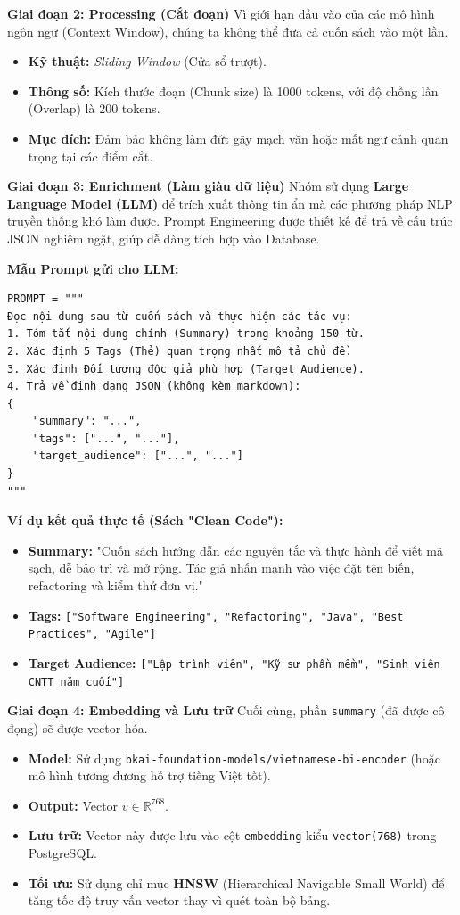 \textbf{Giai đoạn 2: Processing (Cắt đoạn)}
Vì giới hạn đầu vào của các mô hình ngôn ngữ (Context Window), chúng ta không thể đưa cả cuốn sách vào một lần.
\begin{itemize}
    \item \textbf{Kỹ thuật:} \textit{Sliding Window} (Cửa sổ trượt).
    \item \textbf{Thông số:} Kích thước đoạn (Chunk size) là 1000 tokens, với độ chồng lấn (Overlap) là 200 tokens.
    \item \textbf{Mục đích:} Đảm bảo không làm đứt gãy mạch văn hoặc mất ngữ cảnh quan trọng tại các điểm cắt.
\end{itemize}

\textbf{Giai đoạn 3: Enrichment (Làm giàu dữ liệu)}
Nhóm sử dụng \textbf{Large Language Model (LLM)} để trích xuất thông tin ẩn mà các phương pháp NLP truyền thống khó làm được. Prompt Engineering được thiết kế để trả về cấu trúc JSON nghiêm ngặt, giúp dễ dàng tích hợp vào Database.

\textbf{Mẫu Prompt gửi cho LLM:}
\begin{verbatim}
PROMPT = """
Đọc nội dung sau từ cuốn sách và thực hiện các tác vụ:
1. Tóm tắt nội dung chính (Summary) trong khoảng 150 từ.
2. Xác định 5 Tags (Thẻ) quan trọng nhất mô tả chủ đề.
3. Xác định Đối tượng độc giả phù hợp (Target Audience).
4. Trả về định dạng JSON (không kèm markdown):
{
    "summary": "...",
    "tags": ["...", "..."],
    "target_audience": ["...", "..."]
}
"""
\end{verbatim}

\textbf{Ví dụ kết quả thực tế (Sách "Clean Code"):}
\begin{itemize}
    \item \textbf{Summary:} "Cuốn sách hướng dẫn các nguyên tắc và thực hành để viết mã sạch, dễ bảo trì và mở rộng. Tác giả nhấn mạnh vào việc đặt tên biến, refactoring và kiểm thử đơn vị."
    \item \textbf{Tags:} \texttt{["Software Engineering", "Refactoring", "Java", "Best Practices", "Agile"]}
    \item \textbf{Target Audience:} \texttt{["Lập trình viên", "Kỹ sư phần mềm", "Sinh viên CNTT năm cuối"]}
\end{itemize}

\textbf{Giai đoạn 4: Embedding và Lưu trữ}
Cuối cùng, phần \texttt{summary} (đã được cô đọng) sẽ được vector hóa.
\begin{itemize}
    \item \textbf{Model:} Sử dụng \texttt{bkai-foundation-models/vietnamese-bi-encoder} (hoặc mô hình tương đương hỗ trợ tiếng Việt tốt).
    \item \textbf{Output:} Vector $v \in \mathbb{R}^{768}$.
    \item \textbf{Lưu trữ:} Vector này được lưu vào cột \texttt{embedding} kiểu \texttt{vector(768)} trong PostgreSQL.
    \item \textbf{Tối ưu:} Sử dụng chỉ mục \textbf{HNSW} (Hierarchical Navigable Small World) để tăng tốc độ truy vấn vector thay vì quét toàn bộ bảng.
\end{itemize}


